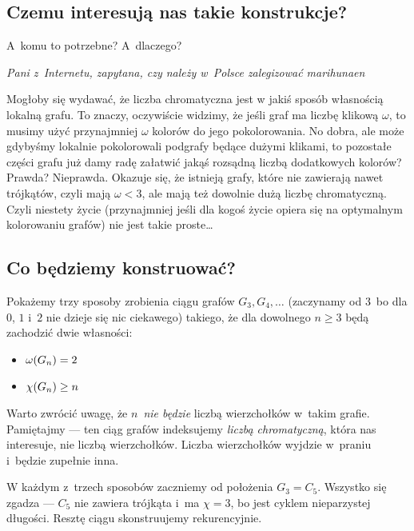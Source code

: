 \subsection{Czemu interesują nas takie konstrukcje?}
\epigraph{A~komu to potrzebne? A~dlaczego?}{\textit{Pani z~Internetu, zapytana, czy należy w~Polsce zalegizować marihunaen}}
Mogłoby się wydawać, że liczba chromatyczna jest w jakiś sposób własnością lokalną grafu. To znaczy, oczywiście widzimy, że jeśli graf ma liczbę klikową $\omega$, to musimy użyć przynajmniej $\omega$ kolorów do jego pokolorowania. No dobra, ale może gdybyśmy lokalnie pokolorowali podgrafy będące dużymi klikami, to pozostałe części grafu już damy radę załatwić jakąś rozsądną liczbą dodatkowych kolorów? Prawda? Nieprawda. Okazuje się, że istnieją grafy, które nie zawierają nawet trójkątów, czyli mają $\omega < 3$, ale mają też dowolnie dużą liczbę chromatyczną. Czyli niestety życie (przynajmniej jeśli dla kogoś życie opiera się na optymalnym kolorowaniu grafów) nie jest takie proste\dots
\subsection{Co będziemy konstruować?}
Pokażemy trzy sposoby zrobienia ciągu grafów $G_3, G_4, \ldots$ (zaczynamy od $3$~bo dla $0$, $1$ i~$2$ nie dzieje się nic ciekawego) takiego, że dla dowolnego $n \geq 3$ będą zachodzić dwie własności:
\begin{itemize}
	\item $\omega\pars{G_n} = 2$
	\item $\chi\pars{G_n} \geq n$
\end{itemize}
Warto zwrócić uwagę, że $n$~\emph{nie będzie} liczbą wierzchołków w~takim grafie. Pamiętajmy --- ten ciąg grafów indeksujemy \emph{liczbą chromatyczną}, która nas interesuje, nie liczbą wierzchołków. Liczba wierzchołków wyjdzie w~praniu i~będzie zupełnie inna.

W każdym z~trzech sposobów zaczniemy od położenia $G_3 = C_5$. Wszystko się zgadza --- $C_5$ nie zawiera trójkąta i~ma $\chi = 3$, bo jest cyklem nieparzystej długości. Resztę ciągu skonstruujemy rekurencyjnie.
